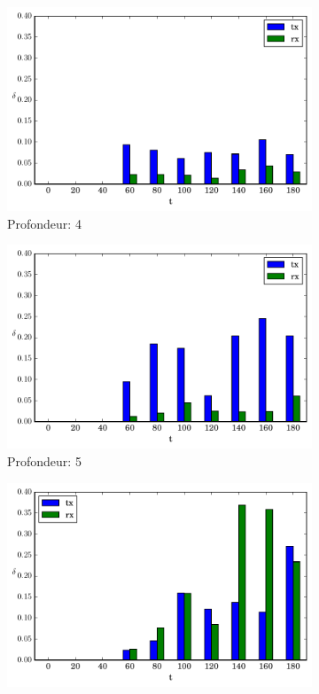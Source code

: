 \begin{figure}[h]
  \begin{subfigure}{0.3\textwidth}
    \includegraphics[width=\textwidth]{img/evolution_noinfo_4.pdf}
    \caption{Profondeur: 4}
    \label{supervision:fig:noinfo_4}
  \end{subfigure}
  \begin{subfigure}{0.3\textwidth}
    \includegraphics[width=\textwidth]{img/evolution_noinfo_5.pdf}
    \caption{Profondeur: 5}
    \label{supervision:fig:noinfo_5}
  \end{subfigure}
  \begin{subfigure}{0.3\textwidth}
    \includegraphics[width=\textwidth]{img/evolution_noinfo_6.pdf}

\end{subfigure}
\end{figure}
